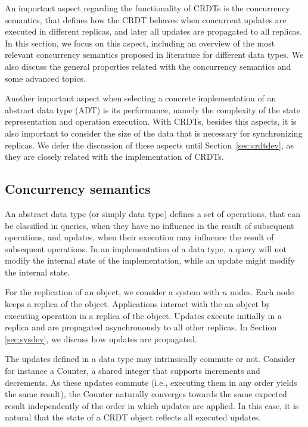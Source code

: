 \documentclass[12pt]{article}
\begin{document}
An important aspect regarding the functionality of CRDTs is the 
concurrency semantics, that defines how the CRDT behaves when concurrent updates
are executed in different replicas, and later all updates are propagated 
to all replicas. 
In this section, we focus on this aspect, including an overview of the most 
relevant concurrency semantics proposed in literature for different data types.
We also discuss the general properties related with the concurrency semantics and
some advanced topics.

Another important aspect when selecting a concrete implementation of an abstract 
data type (ADT) is its performance, namely the complexity of the state representation and
operation execution. With CRDTs, besides this aspects, it is also important to 
consider the size of the data that is necessary for synchronizing replicas.
We defer the discussion of these aspects until Section~\ref{sec:crdtdev}, as
they are closely related with the implementation of CRDTs.



\subsection{Concurrency semantics}\label{sec:appdev:conc_sem}

An abstract data type (or simply data type) defines a set of operations,
that can be classified in queries, when they have no influence in the
result of subsequent operations, and updates, when their execution may 
influence the result of subsequent operations.
In an implementation of a data type, a query will not modify the internal state
of the implementation, while an update might modify the internal state.

For the replication of an object, we consider a system with $n$ nodes.
Each node keeps a replica of the object. Applications interact with the an object
by executing operation in a replica of the object. Updates execute initially in a
replica and are propagated asynchronously to all other replicas. 
In Section \ref{sec:sysdev}, we discuss how updates are propagated.

The updates defined in a data type may intrinsically commute or not. 
Consider for instance a Counter, a shared integer that supports increments 
and decrements. 
As these updates commute (i.e., executing them in any order yields the same result), 
the Counter naturally converges towards the same expected result
independently of the order in which updates are applied.
In this case, it is natural that the state of a CRDT object reflects all 
executed updates.
\end{document}
